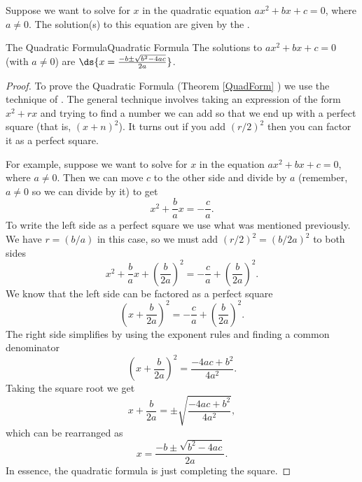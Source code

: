 Suppose we want to solve for $x$ in the quadratic
equation $ax^2+bx+c=0$, where $a\neq 0$.
The solution(s) to this equation are given by the .\\

\begin{theorem}{The Quadratic Formula}{Quadratic Formula}
\label{QuadForm}	 
The solutions to $ax^2+bx+c=0$ (with $a\neq 0$) are $\ds{x=\frac{-b\pm\sqrt{b^2-4ac}}{2a}}$.
\end{theorem}

\begin{proof}
To prove the Quadratic Formula (Theorem \ref{QuadForm} ) we use the technique of . The general technique involves taking an expression of the 
form $x^2+rx$ and trying to find a number we can add so that we end up 
with a perfect square (that is, $(x+n)^2$). It turns out if you add $(r/2)^2$ 
then you can factor it as a perfect square.

For example, suppose we want to solve for $x$ in the equation $ax^2+bx+c=0$, where $a\neq 0$.
Then we can move $c$ to the other side and divide by $a$ (remember, $a\neq 0$ so we can divide by it) to get
$$x^2+\frac{b}{a}x=-\frac{c}{a}.$$
To write the left side as a perfect square we use what was mentioned previously.
We have $r=(b/a)$ in this case, so we must add $(r/2)^2=(b/2a)^2$ to both sides
$$x^2+\frac{b}{a}x+\left(\frac{b}{2a}\right)^2=-\frac{c}{a}+\left(\frac{b}{2a}\right)^2.$$
We know that the left side can be factored as a perfect square
$$\left(x+\frac{b}{2a}\right)^2=-\frac{c}{a}+\left(\frac{b}{2a}\right)^2.$$
The right side simplifies by using the exponent rules and finding a common denominator
$$\left(x+\frac{b}{2a}\right)^2=\frac{-4ac+b^2}{4a^2}.$$
Taking the square root we get
$$x+\frac{b}{2a}=\pm\sqrt{\frac{-4ac+b^2}{4a^2}},$$
which can be rearranged as
$$x=\frac{-b\pm\sqrt{b^2-4ac}}{2a}.$$
In essence, the quadratic formula is just completing the square.
\end{proof}